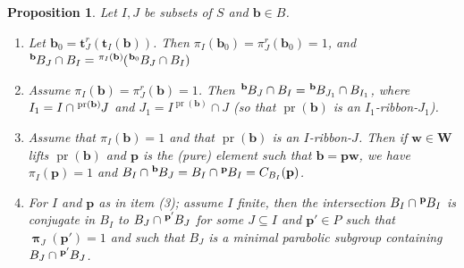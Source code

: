 \documentclass{amsart}
\numberwithin{equation}{section}
\newtheorem{proposition}[equation]{Proposition}
\newcommand\lexp[2]{\kern\scriptspace\vphantom{#2}^{#1}\kern-\scriptspace#2}
\newcommand\bb{{\mathbf b}}
\newcommand\bp{{\mathbf p}}
\newcommand\bt{{\mathbf t}}
\newcommand\bw{{\mathbf w}}
\newcommand\bW{{\mathbf W}}
\DeclareMathOperator\pr{pr}
\DeclareMathOperator\bpi{\boldsymbol\pi}
\begin{document}
\begin{proposition}\label{not enough}
Let   $I,J$  be  subsets   of  $S$  and   $\bb\in  B$. 
\begin{enumerate}
\item  Let  $\bb_0=\bt_J^r(\bt_I(\bb))$.  Then
$\pi_I(\bb_0)=\pi_J^r(\bb_0)=1$, and $\lexp\bb B_J\cap
B_I=\lexp{\pi_I(\bb)}(\lexp{\bb_0}B_J\cap B_I)$
\item
Assume $\pi_I(\bb)=\pi_J^r(\bb)=1$. Then 
$\lexp\bb B_J\cap B_I=\lexp\bb B_{J_1}\cap B_{I_1}$, where
$I_1= I\cap\lexp{\pr(\bb)}J$ and $J_1= I^{\pr(\bb)}\cap J$ (so that
$\pr(\bb)$ is an $I_1$-ribbon-$J_1$).
\item Assume that $\pi_I(\bb)=1$ and that $\pr(\bb)$ is an $I$-ribbon-$J$. Then
if $\bw\in \bW$ lifts $\pr(\bb)$  and $\bp$ is the (pure) element such that $\bb=\bp\bw$,
we have $\pi_I(\bp)=1$ and $B_I\cap\lexp \bb B_J=B_I\cap \lexp\bp B_I=C_{B_I}(\bp)$.
\item For $I$ and $\bp$ as in item (3); assume $I$ finite, then the intersection
$B_I\cap \lexp \bp B_I$ is conjugate
in $B_I$ to $B_J\cap\lexp {\bp'} B_J$ for some $J\subseteq I$ and $\bp'\in P$
such that
$\bpi_J(\bp')=1$ and such that $B_J$ is a minimal parabolic subgroup
containing $B_J\cap\lexp {\bp'} B_J$.
\end{enumerate} 
\end{proposition}
\end{document}
